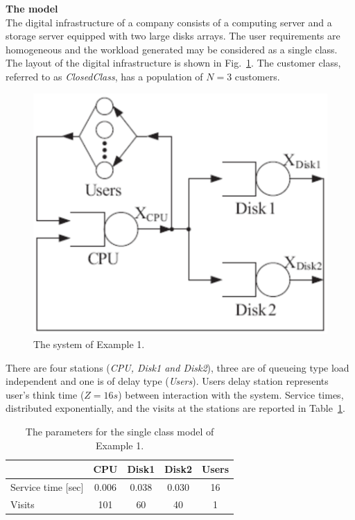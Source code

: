 \noindent \textbf{The model}\\
The digital infrastructure of a company consists of a computing
server and a storage server equipped with two large disks arrays.
The user requirements are homogeneous and the workload generated
may be considered as a single class. The layout of the digital
infrastructure is shown in Fig.~\ref{fig:ex1layout}. The customer
class, referred to as \emph{ClosedClass}, has a population of
$N=3$ customers.
\begin{figure}[htb]
    \begin{center}
        \includegraphics[scale=.5]{img/jsimg/12.1.eps}
    \end{center}
    \caption{The system of Example 1.}
    \label{fig:ex1layout}
\end{figure}
There are four stations (\emph{CPU, Disk1 and Disk2}), three are
of queueing type load independent and one is of delay type
(\emph{Users}). Users delay station represents user's think time
($Z=16s$) between interaction with the system. Service times,
distributed exponentially, and the visits at the stations are
reported in Table~\ref{fig:ex1par}.\\

\begin{table}
\begin{center}
  \begin{tabular}{|l|c|c|c|c|}
\hline
     &CPU  &Disk1  &Disk2&Users  \\ \hline
    Service time [sec] &0.006  &0.038  &0.030&16  \\ \hline
    Visits &101  &60  &40&1  \\ \hline
      \end{tabular}\\
\end{center}
 \caption{The parameters for the single class model of Example 1.}
 \label{fig:ex1par}
\end{table}

